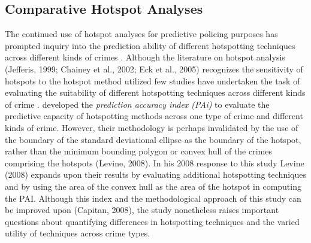 \documentclass[12pt, letterpaper]{article}
\begin{document}
\subsection{Comparative Hotspot Analyses}
The continued use of hotspot analyses for predictive policing purposes has prompted inquiry into the prediction ability of different hotspotting techniques across different kinds of crimes \citep{chainey2008utility, NIJHillsborough2009, NIJLincoln2009, NIJCharlotte2009}. Although the literature on hotspot analysis (Jefferis, 1999; Chainey et al., 2002; Eck et al., 2005) recognizes the sensitivity of hotspots to the hotspot method utilized few studies have undertaken the task of evaluating the suitability of different hotspotting techniques across different kinds of crime \citep{chainey2008utility}. \citet{chainey2008utility} developed the \emph{prediction accuracy index (PAi)} to evaluate the predictive capacity of hotspotting methods across one type of crime and different kinds of crime. However, their methodology is perhaps invalidated by the use of the boundary of the standard deviational ellipse as the boundary of the hotspot, rather than the minimum bounding polygon or convex hull of the crimes comprising the hotspots (Levine, 2008). In his 2008 response to this study Levine (2008) expands upon their results by evaluating additional hotspotting techniques and by using the area of the convex hull as the area of the hotspot in computing the PAI. Although this index and the methodological approach of this study can be improved upon (Capitan, 2008), the study nonetheless raises important questions about quantifying differences in hotspotting techniques and the varied utility of techniques across crime types.    
\end{document}
